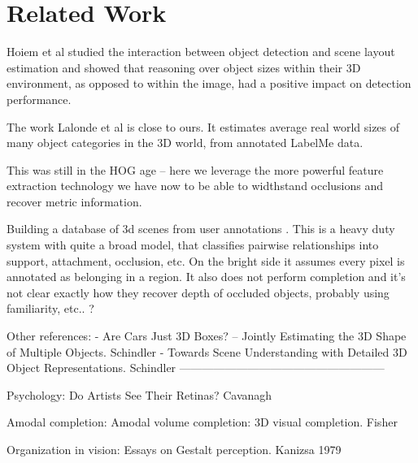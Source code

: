 \section{Related Work}


Hoiem et al \cite{hoiem2008putting} studied the interaction between object detection and scene layout estimation and showed that reasoning over object sizes within their 3D environment, as opposed to within the image, had a positive impact on detection performance. 

The work Lalonde et al \cite{lalonde2007photo} is close to ours. It estimates average real world sizes of many object categories in the 3D world, from annotated LabelMe data.

This was still in the HOG age  \cite{dalal2005histograms} -- here we leverage the more powerful feature extraction technology we have now to be able to widthstand occlusions and recover metric information.

Building a database of 3d scenes from user annotations \cite{russell2009building}. This is a heavy duty system with quite a broad model, that classifies pairwise relationships into support, attachment, occlusion, etc. On the bright side it assumes every pixel is annotated as belonging in a region. It also does not perform completion and it's not clear  exactly how they recover depth of occluded objects, probably using familiarity, etc.. ?
 
 Other references:
-  Are Cars Just 3D Boxes? – Jointly Estimating the 3D Shape of Multiple Objects. Schindler
-  Towards Scene Understanding with Detailed 3D Object Representations. Schindler
------------------------------------------------------

Psychology:
Do Artists See Their Retinas? Cavanagh

Amodal completion:
Amodal volume completion: 3D visual completion. Fisher


Organization in vision: Essays on Gestalt perception. Kanizsa 1979

%
